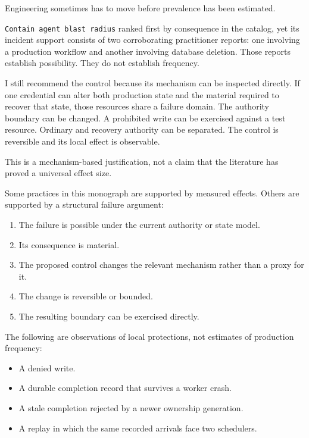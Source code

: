 Engineering sometimes has to move before prevalence has been estimated.

\texttt{Contain agent blast radius} ranked first by consequence in the catalog, yet its incident support consists of two corroborating practitioner reports: one involving a production workflow and another involving database deletion. Those reports establish possibility. They do not establish frequency.

I still recommend the control because its mechanism can be inspected directly. If one credential can alter both production state and the material required to recover that state, those resources share a failure domain. The authority boundary can be changed. A prohibited write can be exercised against a test resource. Ordinary and recovery authority can be separated. The control is reversible and its local effect is observable.

This is a mechanism-based justification, not a claim that the literature has proved a universal effect size.

Some practices in this monograph are supported by measured effects. Others are supported by a structural failure argument:

\begin{enumerate}
\def\labelenumi{\arabic{enumi}.}
\tightlist
\item
  The failure is possible under the current authority or state model.
\item
  Its consequence is material.
\item
  The proposed control changes the relevant mechanism rather than a proxy for it.
\item
  The change is reversible or bounded.
\item
  The resulting boundary can be exercised directly.
\end{enumerate}

The following are observations of local protections, not estimates of production frequency:

\begin{itemize}
\tightlist
\item
  A denied write.
\item
  A durable completion record that survives a worker crash.
\item
  A stale completion rejected by a newer ownership generation.
\item
  A replay in which the same recorded arrivals face two schedulers.
\end{itemize}

